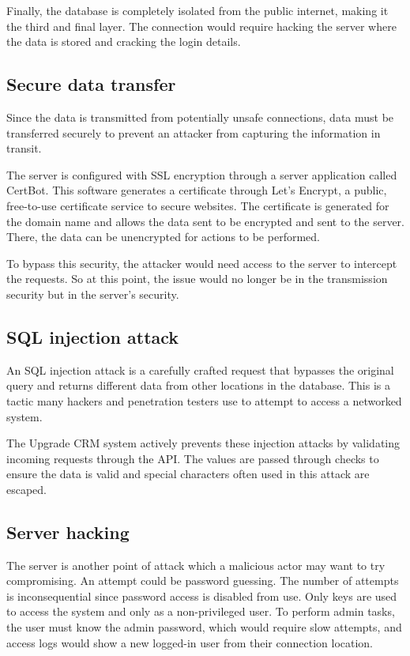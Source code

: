 Finally, the database is completely isolated from the public internet, making it the third and final layer. The connection would require hacking the server where the data is stored and cracking the login details.


\subsection{Secure data transfer}
Since the data is transmitted from potentially unsafe connections, data must be transferred securely to prevent an attacker from capturing the information in transit.

The server is configured with SSL encryption through a server application called CertBot. This software generates a certificate through Let's Encrypt, a public, free-to-use certificate service to secure websites. The certificate is generated for the domain name and allows the data sent to be encrypted and sent to the server. There, the data can be unencrypted for actions to be performed.

To bypass this security, the attacker would need access to the server to intercept the requests. So at this point, the issue would no longer be in the transmission security but in the server's security.


\subsection{SQL injection attack}
An SQL injection attack is a carefully crafted request that bypasses the original query and returns different data from other locations in the database. This is a tactic many hackers and penetration testers use to attempt to access a networked system.

The Upgrade CRM system actively prevents these injection attacks by validating incoming requests through the API. The values are passed through checks to ensure the data is valid and special characters often used in this attack are escaped.


\subsection{Server hacking}
The server is another point of attack which a malicious actor may want to try compromising. An attempt could be password guessing. The number of attempts is inconsequential since password access is disabled from use. Only keys are used to access the system and only as a non-privileged user. To perform admin tasks, the user must know the admin password, which would require slow attempts, and access logs would show a new logged-in user from their connection location.


